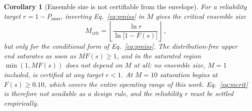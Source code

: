 \documentclass[10pt,conference]{IEEEtran}
\newtheorem{corollary}[theorem]{Corollary}
\theoremstyle{definition}
\begin{document}
\begin{corollary}[Ensemble size is not certifiable from the envelope]\label{cor:mcrit}
  For a reliability target $r = 1 - P_{\mathrm{miss}}$, inverting Eq.~\eqref{eq:pmiss} in $M$ gives the critical ensemble size
  \begin{equation}\label{eq:mcrit}
    M_{\mathrm{crit}} = \left\lfloor \frac{\ln r}{\ln\!\bigl[1 - F(s)\bigr]} \right\rfloor\,,
  \end{equation}
  \emph{but only for the conditional form} of Eq.~\eqref{eq:pmiss}. The distribution-free upper end saturates as soon as $M F(s) \ge 1$, and in the saturated region $\min(1, M F(s))$ does not depend on $M$ at all: no ensemble size, $M = 1$ included, is certified at any target $r < 1$. At $M = 10$ saturation begins at $F(s) \ge 0.10$, which covers the entire operating range of this work. Eq.~\eqref{eq:mcrit} is therefore not available as a design rule, and the reliability $r$ must be settled empirically.
\end{corollary}
\end{document}
